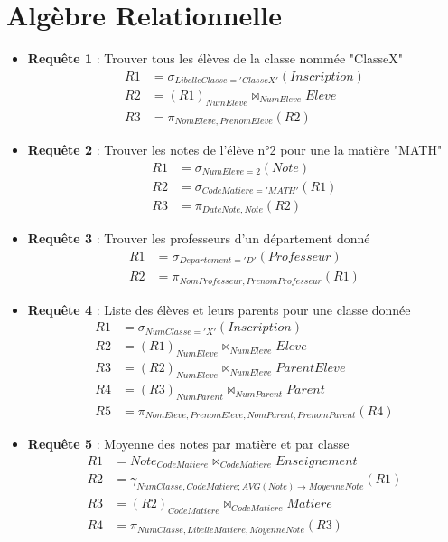 \documentclass[a4paper,12pt]{article}
\begin{document}
\section{Algèbre Relationnelle}
\begin{itemize}
  \item \textbf{Requête 1} : Trouver tous les élèves de la classe nommée "ClasseX"
  \begin{align*}
      R1 &= \sigma_{LibelleClasse = 'ClasseX'}(Inscription) \\
      R2 &= (R1)_{NumEleve} \bowtie_{NumEleve} Eleve \\
      R3 &= \pi_{NomEleve, PrenomEleve}(R2)
  \end{align*}
  
  \item \textbf{Requête 2} : Trouver les notes de l'élève n°2 pour une la matière "MATH"
  \begin{align*}
      R1 &= \sigma_{NumEleve = 2}(Note) \\
      R2 &= \sigma_{CodeMatiere = 'MATH'}(R1) \\
      R3 &= \pi_{DateNote, Note}(R2)
  \end{align*}
  
  \item \textbf{Requête 3} : Trouver les professeurs d'un département donné
  \begin{align*}
      R1 &= \sigma_{Departement = 'D'}(Professeur) \\
      R2 &= \pi_{NomProfesseur, PrenomProfesseur}(R1)
  \end{align*}

  \item \textbf{Requête 4} : Liste des élèves et leurs parents pour une classe donnée
  \begin{align*}
      R1 &= \sigma_{NumClasse = 'X'}(Inscription) \\
      R2 &= (R1)_{NumEleve} \bowtie_{NumEleve} Eleve \\
      R3 &= (R2)_{NumEleve} \bowtie_{NumEleve} ParentEleve \\
      R4 &= (R3)_{NumParent} \bowtie_{NumParent} Parent \\
      R5 &= \pi_{NomEleve, PrenomEleve, NomParent, PrenomParent}(R4)
  \end{align*}

  \item \textbf{Requête 5} : Moyenne des notes par matière et par classe
  \begin{align*}
      R1 &= Note_{CodeMatiere} \bowtie_{CodeMatiere} Enseignement \\
      R2 &= \gamma_{NumClasse, CodeMatiere; AVG(Note) \rightarrow MoyenneNote}(R1) \\
      R3 &= (R2)_{CodeMatiere} \bowtie_{CodeMatiere} Matiere \\
      R4 &= \pi_{NumClasse, LibelleMatiere, MoyenneNote}(R3)
  \end{align*}


\end{itemize}
\end{document}
